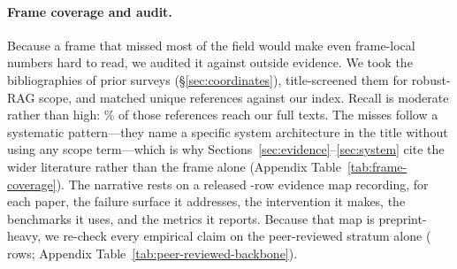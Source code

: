 \paragraph{Frame coverage and audit.}
Because a frame that missed most of the field would make even frame-local numbers hard to
read, we audited it against outside evidence. We took the bibliographies of \CovNSurveys{}
prior surveys (\S\ref{sec:coordinates}), title-screened them for robust-RAG scope, and
matched \CovPooledInScope{} unique references against our index. Recall is moderate rather
than high: \CovRecallTextsPct\% \CovRecallTextsCI{} of those references reach our
\FlowTexts{} full texts. The misses follow a systematic pattern---they name a specific system
architecture in the title without using any scope term---which is why
Sections~\ref{sec:evidence}--\ref{sec:system} cite the wider literature rather than the frame
alone (Appendix Table~\ref{tab:frame-coverage}). The narrative rests on a released
\MapRows{}-row evidence map recording, for each paper, the failure surface it addresses, the
intervention it makes, the benchmarks it uses, and the metrics it reports. Because that map
is preprint-heavy, we re-check every empirical claim on the peer-reviewed stratum alone
(\MapPeerReviewed{} rows; Appendix Table~\ref{tab:peer-reviewed-backbone}).
